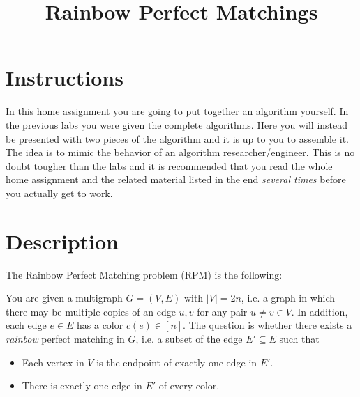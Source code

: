 \documentclass{tufte-handout}
\title{Rainbow Perfect Matchings}
\author{}
\begin{document}
\maketitle
\section*{Instructions}
In this home assignment you are going to put together an algorithm yourself. In the previous labs you were given the complete algorithms. Here you will instead be presented with two pieces of the algorithm and it is up to you to assemble it. The idea is to mimic the behavior of an algorithm researcher/engineer. This is no doubt tougher than the labs and it is recommended that you read the whole home assignment and the related material listed in the end \emph{several times} before you actually get to work.

\section*{Description}
\noindent The Rainbow Perfect Matching problem (RPM) is the following: 

You are given a multigraph $G=(V,E)$ with $|V|=2n$, i.e. a graph in which there may be multiple copies of an edge $u,v$ for any pair $u\neq v\in V$. In addition, each edge $e\in E$ has a color $c(e)\in [n]$. The question is whether there exists a \emph{rainbow} perfect matching in $G$, i.e. a subset of the edge $E'\subseteq E$ such that
\begin{itemize}
\item Each vertex in $V$ is the endpoint of exactly one edge in $E'$.
\item There is exactly one edge in $E'$ of every color.
\end{itemize}
\end{document}
